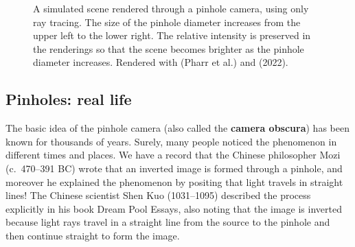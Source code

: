 \documentclass[
  letterpaper,
]{book}
\begin{document}
\begin{figure}


\caption{\label{fig-pinhole-chessset}A simulated scene rendered through
a pinhole camera, using only ray tracing. The size of the pinhole
diameter increases from the upper left to the lower right. The relative
intensity is preserved in the renderings so that the scene becomes
brighter as the pinhole diameter increases. Rendered with (Pharr et al.)
and (2022).}

\end{figure}%

\subsection{Pinholes: real life}\label{pinholes-real-life}

The basic idea of the pinhole camera (also called the \textbf{camera
obscura}) has been known for thousands of years. Surely, many people
noticed the phenomenon in different times and places. We have a record
that the Chinese philosopher Mozi (c.~470--391 BC) wrote that an
inverted image is formed through a pinhole, and moreover he explained
the phenomenon by positing that light travels in straight lines! The
Chinese scientist Shen Kuo (1031--1095) described the process explicitly
in his book Dream Pool Essays, also noting that the image is inverted
because light rays travel in a straight line from the source to the
pinhole and then continue straight to form the image.
\end{document}

